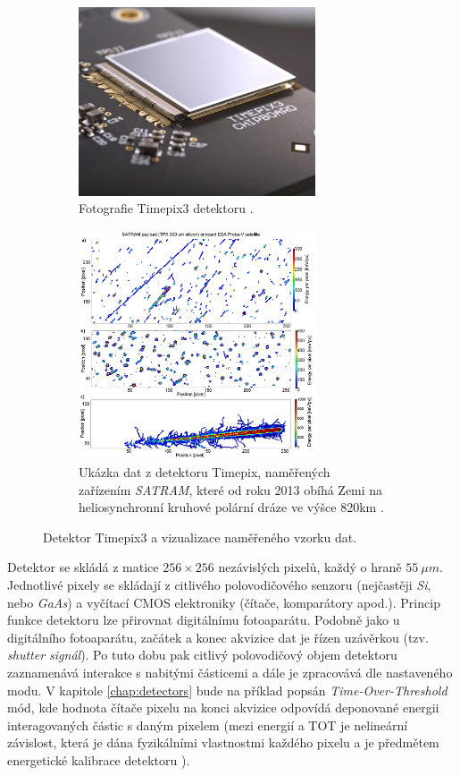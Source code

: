 \begin{figure}[h]
    \begin{center}
        \begin{subfigure}{7.0cm}
            \includegraphics[width=7cm]{figures/timepix3.jpg}    
            \caption{Fotografie Timepix3 detektoru \cite{medipix_from_medical_img_to_space}.}
        \end{subfigure}
        \hspace{0.1cm}
        \begin{subfigure}{7.0cm}
            \includegraphics[width=7cm]{figures/timepix_data_satram.png}    
            \caption{Ukázka dat z detektoru Timepix, naměřených zařízením \textit{SATRAM}, které od roku 2013 obíhá Zemi na heliosynchronní kruhové polární dráze ve výšce \unit{820}{km} \cite{PlatkevicDisertace}.}
        \end{subfigure}
	\end{center}
    \caption{Detektor Timepix3 a vizualizace naměřeného vzorku dat.}
	\label{fig:master:frontend:detector_detail}
\end{figure}

Detektor se skládá z matice $256\times256$ nezávislých pixelů, každý o hraně $55~\mu m$. 
Jednotlivé pixely se skládají z citlivého polovodičového senzoru (nejčastěji \textit{Si}, nebo \textit{GaAs}) a vyčítací CMOS elektroniky (čítače, komparátory apod.). Princip funkce detektoru lze přirovnat digitálnímu fotoaparátu. Podobně jako u digitálního fotoaparátu, začátek a konec akvizice dat je řízen uzávěrkou (tzv. \textit{shutter signál}). Po tuto dobu pak citlivý polovodičový objem detektoru zaznamenává interakce s nabitými částicemi a dále je zpracovává dle nastaveného modu. V kapitole \ref{chap:detectors} bude na příklad popsán \textit{Time-Over-Threshold} mód, kde hodnota čítače pixelu na konci akvizice odpovídá deponované energii interagovaných částic s daným pixelem (mezi energií a TOT je nelineární závislost, která je dána fyzikálními vlastnostmi každého pixelu a je předmětem energetické kalibrace detektoru \cite{Jakubek2011S262}). 

